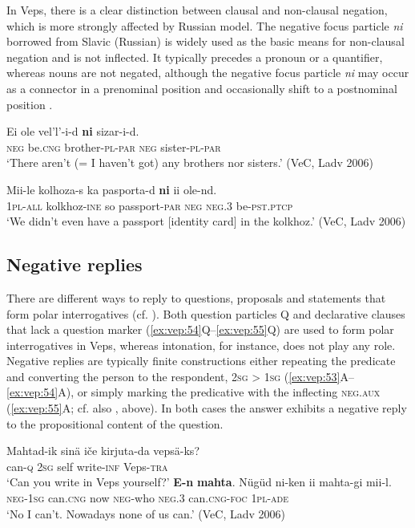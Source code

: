 \documentclass[output=paper,colorlinks=true, citecolor=brown]{langscibook}
\begin{document}
In Veps, there is a clear distinction between clausal and non-clausal negation, which is more strongly affected by Russian model. The negative focus particle \textit{ni} borrowed from Slavic (Russian) is widely used as the basic means for non-clausal negation and is not inflected. It typically precedes a pronoun or a quantifier, whereas nouns are not negated, although the negative focus particle \textit{ni} may occur as a connector  in a prenominal position and occasionally shift to a postnominal position .

\ea
    \label{ex:vep:51}
    \gll Ei ole vel’l’-i-d  \textbf{ni} sizar-i-d.\\
         \textsc{neg} be.\textsc{cng} brother{}-\textsc{pl}{}-\textsc{par} \textsc{neg} sister{}-\textsc{pl}{}-\textsc{par}\\
    \glt ‘There aren’t (= I haven’t got) any brothers nor sisters.’ (VeC, Ladv 2006)
\z

\ea
    \label{ex:vep:52}
    \gll Mii-le  kolhoza-s ka pasporta-d \textbf{ni} ii ole-nd. \\
         \textsc{1pl-all} kolkhoz{}-\textsc{ine} so passport-\textsc{par} \textsc{neg} \textsc{neg.3} be-\textsc{pst.ptcp}\\
    \glt ‘We didn’t even have a passport [identity card] in the kolkhoz.’ (VeC, Ladv 2006)
\z

\subsection{Negative replies}\label{sec:vep:3.1}

There are different ways to reply to questions, proposals and statements that form polar interrogatives (cf. \citealt{Miestamo2011}). Both question particles Q and declarative clauses  that lack a question marker (\ref{ex:vep:54}Q--\ref{ex:vep:55}Q) are used to form polar interrogatives in Veps, whereas intonation, for instance, does not play any role. Negative replies are typically finite constructions either repeating the predicate and converting the person to the respondent, \textsc{2sg} > \textsc{1sg} (\ref{ex:vep:53}A--\ref{ex:vep:54}A), or simply marking the predicative with the inflecting \textsc{neg}.\textsc{aux} (\ref{ex:vep:55}A; cf. also , above). In both cases the answer exhibits a negative reply to the propositional content of the question.


\ea\label{ex:vep:53}
    \begin{xlist}[Q: ]
    \label{ex:vep:53A}
        \gll Mahtad-ik sinä iče kirjuta-da vepsä-ks?\\ 
              can-\textsc{q} \textsc{2sg} self write\textsc{-inf} Veps{}-\textsc{tra}\\ 
        \glt ‘Can you write in Veps yourself?’
    \label{ex:vep:53B}
        \gll  \textbf{E-n} \textbf{mahta}. Nügüd ni-ken ii mahta{}-gi mii-l.  \\ 
               \textsc{neg-1sg} can.\textsc{cng} now \textsc{neg}{}-who \textsc{neg.3} can\textsc{.cng{}-foc} \textsc{1pl-ade}\\
        \glt ‘No I can’t. Nowadays none of us can.’ (VeC, Ladv 2006)
    \end{xlist}
\z
\end{document}
